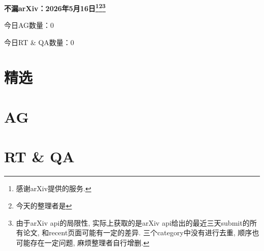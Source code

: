 \documentclass[9pt, a4paper]{article}
\theoremstyle{plain}
\theoremstyle{definition}
\theoremstyle{remark}
\newcommand{\AGnumber}{0}
\newcommand{\RTQAnumber}{0}
\newcommand{\NewestDate}{2026年5月16日}
\newcommand{\todayarXiver}{} %
\begin{document}
\begin{center}
    \Huge\textbf{不漏arXiv：\NewestDate\footnote{感谢arXiv提供的服务.}\footnote{今天的整理者是\todayarXiver}\footnote{由于arXiv api的局限性, 实际上获取的是arXiv api给出的最近三天submit的所有论文, 和recent页面可能有一定的差异. 三个category中没有进行去重, 顺序也可能存在一定问题, 麻烦整理者自行增删.}} \\
\end{center}

\setcounter{section}{-1}

\begin{center}
    今日AG数量：\AGnumber
    
    今日RT \& QA数量：\RTQAnumber
    
\end{center}


\section{精选}


\section{AG}

\section{RT \& QA}
\end{document}
